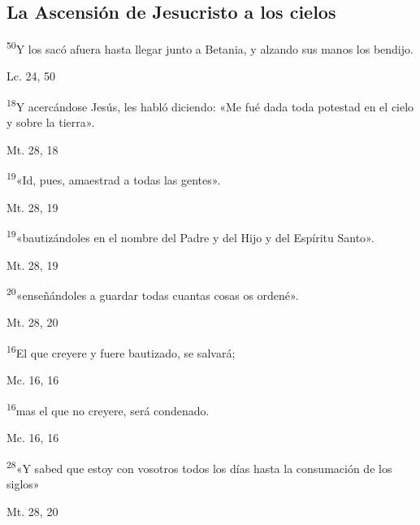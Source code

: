 \documentclass[a4paper,11pt]{article}
\begin{document}
    \subsection*{\hfil La Ascensión de Jesucristo a los cielos \hfil}
      
      \textsuperscript{50}Y los sacó afuera hasta llegar junto a Betania, y alzando sus manos los bendijo.
      \begin{flushright}
        Lc. 24, 50     
      \end{flushright}

      \textsuperscript{18}Y acercándose Jesús, les habló diciendo: «Me fué dada toda potestad en el cielo y sobre la tierra».
      \begin{flushright}
        Mt. 28, 18      
      \end{flushright}

      \textsuperscript{19}«Id, pues, amaestrad a todas las gentes».
      \begin{flushright}
        Mt. 28, 19
      \end{flushright}

      \textsuperscript{19}«bautizándoles en el nombre del Padre y del Hijo y del Espíritu Santo».
      \begin{flushright}
        Mt. 28, 19      
      \end{flushright}

      \textsuperscript{20}«enseñándoles a guardar todas cuantas cosas os ordené».
      \begin{flushright}
        Mt. 28, 20  
      \end{flushright}

      \textsuperscript{16}El que creyere y fuere bautizado, se salvará;
      \begin{flushright}
        Mc. 16, 16
      \end{flushright}

      \textsuperscript{16}mas el que no creyere, será condenado.
      \begin{flushright}
        Mc. 16, 16
      \end{flushright}

      \textsuperscript{28}«Y sabed que estoy con vosotros todos los días hasta la consumación de los siglos»
      \begin{flushright}
        Mt. 28, 20
      \end{flushright}
\end{document}
